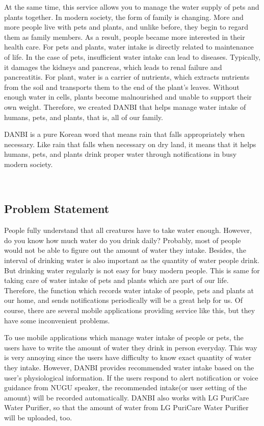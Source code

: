 \documentclass[conference]{IEEEtran}
\begin{document}
At the same time, this service allows you to manage the water supply of pets and plants together. In modern society, the form of family is changing. More and more people live with pets and plants, and unlike before, they begin to regard them as family members. As a result, people became more interested in their health care. For pets and plants, water intake is directly related to maintenance of life. In the case of pets, insufficient water intake can lead to diseases. Typically, it damages the kidneys and pancreas, which leads to renal failure and pancreatitis. For plant, water is a carrier of nutrients, which extracts nutrients from the soil and transports them to the end of the plant's leaves. Without enough water in cells, plants become malnourished and unable to support their own weight. Therefore, we created DANBI that helps manage water intake of humans, pets, and plants, that is, all of our family.

DANBI is a pure Korean word that means rain that falls appropriately when necessary. Like rain that falls when necessary on dry land, it means that it helps humans, pets, and plants drink proper water through notifications in busy modern society.

\ 
\subsection{Problem Statement}
\setlength{\parindent}{2ex}
People fully understand that all creatures have to take water enough. However, do you know how much water do you drink daily? Probably, most of people would not be able to figure out the amount of water they intake. Besides, the interval of drinking water is also important as the quantity of water people drink. But drinking water regularly is not easy for busy modern people. This is same for taking care of water intake of pets and plants which are part of our life. Therefore, the function which records water intake of people, pets and plants at our home, and sends notifications periodically will be a great help for us. Of course, there are several mobile applications providing service like this, but they have some inconvenient problems.

To use mobile applications which manage water intake of people or pets, the users have to write the amount of water they drink in person everyday. This way is very annoying since the users have difficulty to know exact quantity of water they intake. However, DANBI provides recommended water intake based on the user's physiological information. If the users respond to alert notification or voice guidance from NUGU speaker, the recommended intake(or user setting of the amount) will be recorded automatically. DANBI also works with LG PuriCare Water Purifier, so that the amount of water from LG PuriCare Water Purifier will be uploaded, too.
\end{document}
